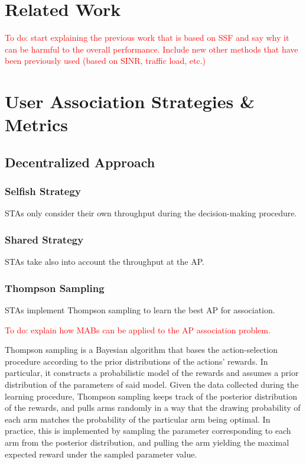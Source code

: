 \documentclass{article}
\begin{document}
\section{Related Work}
\label{section:related_work}
	\textcolor{red}{To do: start explaining the previous work that is based on SSF and say why it can be harmful to the overall performance. Include new other methods that have been previously used (based on SINR, traffic load, etc.)}

\section{User Association Strategies \& Metrics}
\label{section:strategies}

	\subsection{Decentralized Approach}
	\label{section:decentralized}
	
		\subsubsection{Selfish Strategy}
		\label{section:selfish}
			STAs only consider their own throughput during the decision-making procedure.
			
		\subsubsection{Shared Strategy}
		\label{section:shared}
			STAs take also into account the throughput at the AP.
	
		\subsubsection{Thompson Sampling}
		\label{section:thompson}
			STAs implement Thompson sampling to learn the best AP for association. 
			
			\textcolor{red}{To do: explain how MABs can be applied to the AP association problem.}	
			
			Thompson sampling \cite{thompson1933likelihood} is a Bayesian algorithm that bases the action-selection procedure according to the prior distributions of the actions' rewards. In particular, it constructs a probabilistic model of the rewards and assumes a prior distribution of the parameters of said model. Given the data collected during the learning procedure, Thompson sampling keeps track of the posterior distribution of the rewards, and pulls arms randomly in a way that the drawing probability of each arm matches the probability of the particular arm being optimal. In practice, this is implemented by sampling the parameter corresponding to each arm from the posterior distribution, and pulling the arm yielding the maximal expected reward under the sampled parameter value.
					
\end{document}
